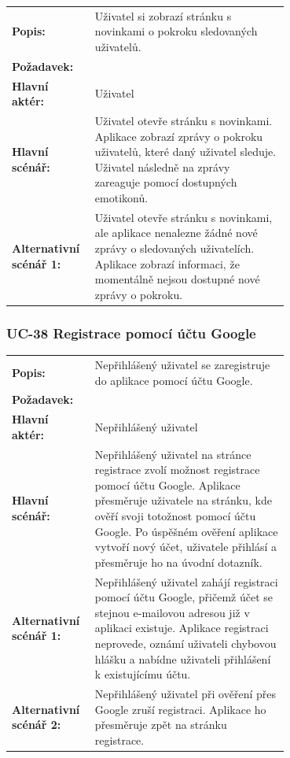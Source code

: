 \begin{tabular}{lp{0.7\linewidth}}
  \textbf{Popis:} & Uživatel si zobrazí stránku s novinkami o pokroku sledovaných uživatelů. \\
  \textbf{Požadavek:} & \nameref{sec:fp-progress-sharing} \\
  \textbf{Hlavní aktér:} & Uživatel \\
  \textbf{Hlavní scénář:} & Uživatel otevře stránku s novinkami. Aplikace zobrazí zprávy o pokroku uživatelů, které daný uživatel sleduje. Uživatel následně na zprávy zareaguje pomocí dostupných emotikonů. \\
  \textbf{Alternativní scénář 1:} & Uživatel otevře stránku s novinkami, ale aplikace nenalezne žádné nové zprávy o sledovaných uživatelích. Aplikace zobrazí informaci, že momentálně nejsou dostupné nové zprávy o pokroku. \\
\end{tabular}

\subsubsection{UC-38 Registrace pomocí účtu Google}

\begin{tabular}{lp{0.7\linewidth}}
  \textbf{Popis:} & Nepřihlášený uživatel se zaregistruje do aplikace pomocí účtu Google. \\
  \textbf{Požadavek:} & \nameref{sec:fp-google-auth} \\
  \textbf{Hlavní aktér:} & Nepřihlášený uživatel \\
  \textbf{Hlavní scénář:} & Nepřihlášený uživatel na stránce registrace zvolí možnost registrace pomocí účtu Google. Aplikace přesměruje uživatele na stránku, kde ověří svoji totožnost pomocí účtu Google. Po úspěšném ověření aplikace vytvoří nový účet, uživatele přihlásí a přesměruje ho na úvodní dotazník. \\
  \textbf{Alternativní scénář 1:} & Nepřihlášený uživatel zahájí registraci pomocí účtu Google, přičemž účet se stejnou e-mailovou adresou již v aplikaci existuje. Aplikace registraci neprovede, oznámí uživateli chybovou hlášku a nabídne uživateli přihlášení k existujícímu účtu. \\
  \textbf{Alternativní scénář 2:} & Nepřihlášený uživatel při ověření přes Google zruší registraci. Aplikace ho přesměruje zpět na stránku registrace. \\
\end{tabular}

